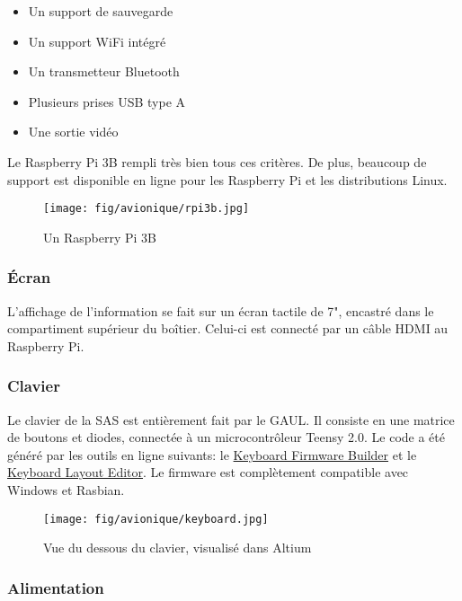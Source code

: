 \begin{itemize}
	\item Un support de sauvegarde
	\item Un support WiFi intégré
	\item Un transmetteur Bluetooth
	\item Plusieurs prises USB type A
	\item Une sortie vidéo
\end{itemize}

Le Raspberry Pi 3B rempli très bien tous ces critères. De plus, beaucoup de
support est disponible en ligne pour les Raspberry Pi et les distributions
Linux.

\begin{figure}[H]
	\center
	\texttt{[image: fig/avionique/rpi3b.jpg]}
	\caption{Un Raspberry Pi 3B}
	\label{f:rpi3b}
\end{figure}

\subsubsection{Écran}

L'affichage de l'information se fait sur un écran tactile de 7", encastré dans
le compartiment supérieur du boîtier. Celui-ci est connecté par un câble HDMI au
Raspberry Pi.

\subsubsection{Clavier}

Le clavier de la SAS est entièrement fait par le GAUL. Il consiste en une
matrice de boutons et diodes, connectée à un microcontrôleur Teensy 2.0. Le
code a été généré par les outils en ligne suivants: le
\href{http://kbfirmware.com/}{Keyboard Firmware Builder} et le
\href{http://www.keyboard-layout-editor.com/}{Keyboard Layout Editor}. Le
firmware est complètement compatible avec Windows et Rasbian.

\begin{figure}[H]
	\center
	\texttt{[image: fig/avionique/keyboard.jpg]}
	\caption{Vue du dessous du clavier, visualisé dans Altium}
	\label{f:keyboard}
\end{figure}

\subsubsection{Alimentation}

